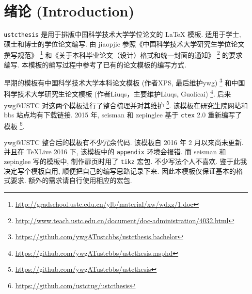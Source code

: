 \chapter{绪论 (Introduction)}

\verb|ustcthesis| 是用于排版中国科学技术大学学位论文的 \LaTeX{} 模板. 适用于学士, 硕士和博士的学位论文编写. 由 jiaopjie 参照《中国科学技术大学研究生学位论文撰写规范》
\footnote{\url{http://gradschool.ustc.edu.cn/ylb/material/xw/wdxz/1.doc}}
和《关于本科毕业论文（设计）格式和统一封面的通知》
\footnote{\url{http://www.teach.ustc.edu.cn/document/doc-administration/4032.html}}
的要求编写. 本模板的编写过程中参考了已有的论文模板的编写方式.

早期的模板有中国科学技术大学本科论文模板 (作者XPS, 最后维护ywg)
\footnote{\url{https://github.com/ywgATustcbbs/ustcthesis.bachelor}}
和中国科学技术大学研究生论文模板 (作者Liuqs，主要维护Liuqs, Guolicai)
\footnote{\url{https://github.com/ywgATustcbbs/ustcthesis.msphd}}.
后来 ywg@USTC 对这两个模板进行了整合梳理并对其维护
\footnote{\url{https://github.com/ywgATustcbbs/ustcthesis}}.
该模板在研究生院网站和 bbs 站点均有下载链接. 2015 年, seisman 和 zepinglee 基于 \verb|ctex| 2.0 重新编写了模板
\footnote{\url{https://github.com/ustctug/ustcthesis}}.

ywg@USTC 整合后的模板有不少冗余代码. 该模板自 2016 年 2 月以来尚未更新. 并且在 TeXLive 2016 下, 该模板中的 \verb|appendix| 环境会报错. 而 seisman 和 zepinglee 写的模板中, 制作扉页时用了 \verb|tikz| 宏包. 不少写法个人不喜欢. 鉴于此我决定写个模板自用, 顺便把自己的编写思路记录下来. 因此本模板仅保证基本的格式要求. 额外的需求请自行使用相应的宏包.

